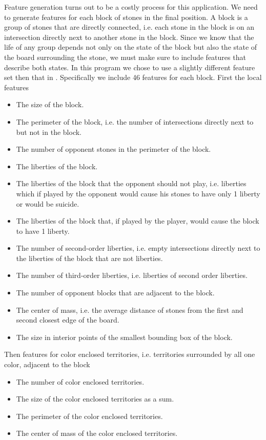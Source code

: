 \documentclass[11pt,letterpaper]{article}
\begin{document}
Feature generation turns out to be a costly process for this application. We need to generate features for each block
of stones in the final position. A block is a group of stones that are directly connected, i.e. each stone in the block is
on an intersection directly next to another stone in the block. Since we know that the life of any group depends not
only on the state of the block but also the state of the board surrounding the stone, we must make sure to include
features that describe both states. In this program we chose to use a slightly different feature set then that in
\cite{WHU:04}. Specifically we include 46 features for each block. First the local features
\begin{itemize}
  \item The size of the block.
  \item The perimeter of the block, i.e. the number of intersections directly next to but not in the block.
  \item The number of opponent stones in the perimeter of the block.
  \item The liberties of the block.
  \item The liberties of the block that the opponent should not play, i.e. liberties which if played by the opponent would
    cause his stones to have only 1 liberty or would be suicide.
  \item The liberties of the block that, if played by the player, would cause the block to have 1 liberty.
  \item The number of second-order liberties, i.e. empty intersections directly next to the liberties of the block that
    are not liberties.
  \item The number of third-order liberties, i.e. liberties of second order liberties.
  \item The number of opponent blocks that are adjacent to the block.
  \item The center of mass, i.e. the average distance of stones from the first and second closest edge of the board.
  \item The size in interior points of the smallest bounding box of the block.
\end{itemize}
Then features for color enclosed territories, i.e. territories surrounded by all one color, adjacent to the block
\begin{itemize}
  \item The number of color enclosed territories.
  \item The size of the color enclosed territories as a sum.
  \item The perimeter of the color enclosed territories.
  \item The center of mass of the color enclosed territories.
\end{itemize}
\end{document}
